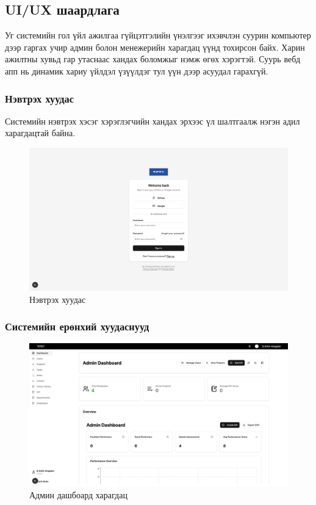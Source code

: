 \subsection{UI/UX шаардлага}
Уг системийн гол үйл ажилгаа гүйцэтгэлийн үнэлгээг ихэвчлэн суурин компьютер дээр гаргах учир админ болон
менежерийн харагдац үүнд тохирсон байх. Харин ажилтны хувьд гар утаснаас хандах боломжыг нэмж өгөх хэрэгтэй.
Суурь вебд апп нь динамик хариу үйлдэл үзүүлдэг тул үүн дээр асуудал гарахгүй.

\subsubsection{Нэвтрэх хуудас}
Системийн нэвтрэх хэсэг хэрэглэгчийн хандах эрхээс үл шалтгаалж нэгэн адил харагдацтай байна.
\begin{figure}[h]
    \centering
    \includegraphics[scale=0.3]{src/images/uiux/login.png}
    \caption{Нэвтрэх хуудас}
    \label{fig:login_page}
\end{figure}

\subsubsection{Системийн ерөнхий хуудаснууд}

\begin{figure}[H]
    \centering
    \includegraphics[scale=0.3]{src/images/uiux/adminDash.png}
    \caption{Админ дашбоард харагдац}
    \label{fig:admin_dashboard_page}
\end{figure}

